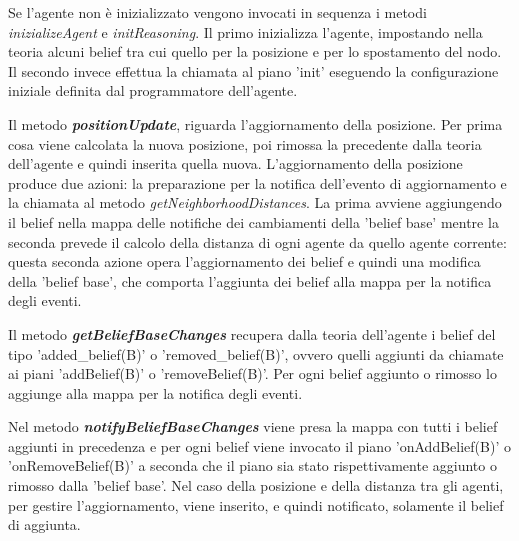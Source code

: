 \documentclass[12pt,a4paper,openright,twoside]{report}
\begin{document}
Se l'agente non \`e inizializzato vengono invocati in sequenza i metodi \textit{inizializeAgent} e \textit{initReasoning}. Il primo inizializza l'agente, impostando nella teoria alcuni belief  tra cui quello per la posizione e per lo spostamento del nodo. Il secondo invece effettua la chiamata al piano 'init' eseguendo la configurazione iniziale definita dal programmatore dell'agente.

Il metodo \textbf{\textit{positionUpdate}}, riguarda l'aggiornamento della posizione. Per prima cosa viene calcolata la nuova posizione, poi rimossa la precedente dalla teoria dell'agente e quindi inserita quella nuova. L'aggiornamento della posizione produce due azioni: la preparazione per la notifica dell'evento di aggiornamento e la chiamata al metodo \textit{getNeighborhoodDistances}. La prima avviene aggiungendo il belief nella mappa delle notifiche dei cambiamenti della 'belief base' mentre la seconda prevede il calcolo della distanza di ogni agente da quello agente corrente: questa seconda azione opera l'aggiornamento dei belief e quindi una modifica della 'belief base', che comporta l'aggiunta dei belief alla mappa per la notifica degli eventi.

Il metodo \textbf{\textit{getBeliefBaseChanges}} recupera dalla teoria dell'agente i belief del tipo 'added\_belief(B)' o 'removed\_belief(B)', ovvero quelli aggiunti da chiamate ai piani 'addBelief(B)' o 'removeBelief(B)'. Per ogni belief aggiunto o rimosso lo aggiunge alla mappa per la notifica degli eventi.

Nel metodo \textbf{\textit{notifyBeliefBaseChanges}} viene presa la mappa con tutti i belief aggiunti in precedenza e per ogni belief viene invocato il piano 'onAddBelief(B)' o 'onRemoveBelief(B)' a seconda che il piano sia stato rispettivamente aggiunto o rimosso dalla 'belief base'. Nel caso della posizione e della distanza tra gli agenti, per gestire l'aggiornamento, viene inserito, e quindi notificato, solamente il belief di aggiunta.
\end{document}

